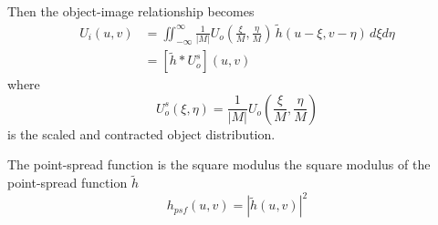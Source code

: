\documentclass{article}
\begin{document}
Then the object-image relationship becomes
\begin{align}
    U_i(u,v) &= \iint_{-\infty}^{\infty} \frac{1}{|M|} U_o\left(\frac{\xi}{M}, \frac{\eta}{M}\right) \, \tilde{h}(u-\xi, v-\eta) \, d\xi d\eta \\
    &= [\tilde{h} \ast U_o^s] (u,v)  
\end{align}
where
\begin{equation}
    U_o^s(\xi, \eta) = \frac{1}{|M|} U_o\left(\frac{\xi}{M}, \frac{\eta}{M}\right)
\end{equation}
is the scaled and contracted object distribution.

The point-spread function is the square modulus the square modulus of the point-spread function $\tilde{h}$
\begin{equation}
    h_{psf}(u,v) = |\tilde{h}(u,v)|^2
\end{equation} 
\end{document}
